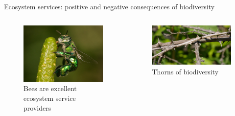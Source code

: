 \documentclass[
  ignorenonframetext,
  aspectratio=169]{beamer}
\newcommand{\bcolumns}{\begin{columns}[T, onlytextwidth]}
\newcommand{\ecolumns}{\end{columns}}
\begin{document}
\begin{frame}{Ecosystem services: positive and negative consequences of
biodiversity}
\protect\hypertarget{ecosystem-services-positive-and-negative-consequences-of-biodiversity}{}
\bcolumns
{}

\begin{figure}
\includegraphics[width=0.8\linewidth]{./../images/bee_D8bkT-lUEAMzS8c} \caption{Bees are excellent ecosystem service providers}\label{fig:pollinator-bees}
\end{figure}


\begin{figure}
\includegraphics[width=0.96\linewidth]{./../images/biodiversity_thorns} \caption{Thorns of biodiversity}\label{fig:biodiversity-thorns}
\end{figure}

\ecolumns
\end{frame}
\end{document}

